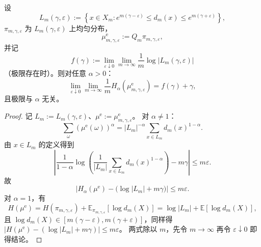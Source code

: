 \begin{theorem}\label{thm:xi-time-part9g-renyi-spectrum-holography}
设
\[
L_m(\gamma,\varepsilon):=
\left\{
x\in X_m:
e^{m(\gamma-\varepsilon)}\le d_m(x)\le e^{m(\gamma+\varepsilon)}
\right\},
\]
\(\pi_{m,\gamma,\varepsilon}\) 为 \(L_m(\gamma,\varepsilon)\) 上均匀分布，
\[
\mu^{\mathrm e}_{m,\gamma,\varepsilon}:=
Q_m\pi_{m,\gamma,\varepsilon},
\]
并记
\[
f(\gamma):=
\lim_{\varepsilon\downarrow 0}\lim_{m\to\infty}
\frac1m\log|L_m(\gamma,\varepsilon)|
\]
（极限存在时）。则对任意 \(\alpha>0\)：
\[
\lim_{\varepsilon\downarrow 0}\lim_{m\to\infty}
\frac1m H_\alpha\!\left(\mu^{\mathrm e}_{m,\gamma,\varepsilon}\right)
=f(\gamma)+\gamma,
\]
且极限与 \(\alpha\) 无关。
\end{theorem}
\begin{proof}
记 \(L_m:=L_m(\gamma,\varepsilon)\)、\(\mu^{\mathrm e}:=\mu^{\mathrm e}_{m,\gamma,\varepsilon}\)。
对 \(\alpha\neq1\)：
\[
\sum_{\omega}(\mu^{\mathrm e}(\omega))^\alpha
=|L_m|^{-\alpha}\sum_{x\in L_m}d_m(x)^{1-\alpha}.
\]
由 \(x\in L_m\) 的定义得到
\[
\left|
\frac{1}{1-\alpha}
\log\!\left(\frac1{|L_m|}\sum_{x\in L_m}d_m(x)^{1-\alpha}\right)
-m\gamma
\right|
\le m\varepsilon.
\]
故
\[
\left|
H_\alpha(\mu^{\mathrm e})-\bigl(\log|L_m|+m\gamma\bigr)
\right|
\le m\varepsilon.
\]
对 \(\alpha=1\)，有
\[
H(\mu^{\mathrm e})
=H(\pi_{m,\gamma,\varepsilon})+\mathbb E_{\pi_{m,\gamma,\varepsilon}}[\log d_m(X)]
=\log|L_m|+\mathbb E[\log d_m(X)],
\]
且 \(\log d_m(X)\in[m(\gamma-\varepsilon),m(\gamma+\varepsilon)]\)，同样得
\(
|H(\mu^{\mathrm e})-(\log|L_m|+m\gamma)|\le m\varepsilon
\)。
两式除以 \(m\)，先令 \(m\to\infty\) 再令 \(\varepsilon\downarrow0\) 即得结论。
\end{proof}

